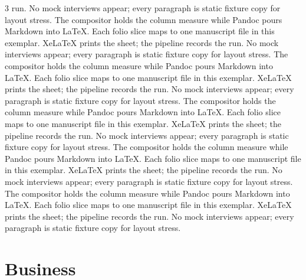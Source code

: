 \documentclass[
]{article}
\begin{document}
\begin{multicols}{3}
run. No mock interviews appear; every paragraph is static fixture copy
for layout stress. The compositor holds the column measure while Pandoc
pours Markdown into LaTeX. Each folio slice maps to one manuscript file
in this exemplar. XeLaTeX prints the sheet; the pipeline records the
run. No mock interviews appear; every paragraph is static fixture copy
for layout stress. The compositor holds the column measure while Pandoc
pours Markdown into LaTeX. Each folio slice maps to one manuscript file
in this exemplar. XeLaTeX prints the sheet; the pipeline records the
run. No mock interviews appear; every paragraph is static fixture copy
for layout stress. The compositor holds the column measure while Pandoc
pours Markdown into LaTeX. Each folio slice maps to one manuscript file
in this exemplar. XeLaTeX prints the sheet; the pipeline records the
run. No mock interviews appear; every paragraph is static fixture copy
for layout stress. The compositor holds the column measure while Pandoc
pours Markdown into LaTeX. Each folio slice maps to one manuscript file
in this exemplar. XeLaTeX prints the sheet; the pipeline records the
run. No mock interviews appear; every paragraph is static fixture copy
for layout stress. The compositor holds the column measure while Pandoc
pours Markdown into LaTeX. Each folio slice maps to one manuscript file
in this exemplar. XeLaTeX prints the sheet; the pipeline records the
run. No mock interviews appear; every paragraph is static fixture copy
for layout stress.

\end{multicols}

\newpage

\section{Business}\label{business}
\end{document}
